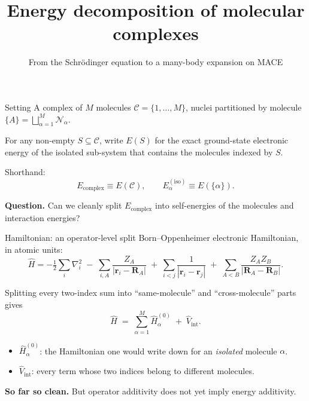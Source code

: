 \documentclass[aspectratio=169,11pt]{beamer}
\title{Energy decomposition of molecular complexes}
\subtitle{From the Schr\"odinger equation to a many-body expansion on \textsc{MACE}}
\author{}
\date{}
\newcommand{\Hop}{\hat{H}}
\newcommand{\Vop}{\hat{V}}
\newcommand{\Eiso}{E^{(\mathrm{iso})}}
\newcommand{\Ecpl}{E_{\mathrm{complex}}}
\begin{document}
\maketitle

\begin{frame}{Setting}
A complex of $M$ molecules
$\mathcal{C}=\{1,\dots,M\}$, nuclei partitioned by molecule
$\{A\}=\bigsqcup_{\alpha=1}^{M}\mathcal{N}_\alpha$.

\bigskip
For any non-empty $S\subseteq\mathcal{C}$, write $E(S)$ for the
exact ground-state electronic energy of the isolated sub-system that
contains the molecules indexed by $S$.

\bigskip
Shorthand:
\[
\Ecpl \equiv E(\mathcal{C}),
\qquad
\Eiso_\alpha \equiv E(\{\alpha\}).
\]

\bigskip
\textbf{Question.} \;Can we cleanly split
$\Ecpl$ into self-energies of the molecules and interaction energies?
\end{frame}

\begin{frame}{Hamiltonian: an operator-level split}
Born--Oppenheimer electronic Hamiltonian, in atomic units:
\[
\Hop = -\tfrac12\!\sum_{i}\nabla_i^2
\;-\;\sum_{i,A}\!\frac{Z_A}{|\mathbf r_i-\mathbf R_A|}
\;+\;\sum_{i<j}\!\frac{1}{|\mathbf r_i-\mathbf r_j|}
\;+\;\sum_{A<B}\!\frac{Z_A Z_B}{|\mathbf R_A-\mathbf R_B|}.
\]

Splitting every two-index sum into ``same-molecule'' and
``cross-molecule'' parts gives
\[
\boxed{\;\Hop \;=\; \sum_{\alpha=1}^{M}\Hop_\alpha^{(0)}
       \;+\;\Vop_{\mathrm{int}}.\;}
\]
\begin{itemize}\setlength\itemsep{2pt}
\item $\Hop_\alpha^{(0)}$: the Hamiltonian one would write down for an
\emph{isolated} molecule $\alpha$.
\item $\Vop_{\mathrm{int}}$: every term whose two indices belong to
different molecules.
\end{itemize}

\textbf{So far so clean.}\;
But operator additivity does not yet imply energy additivity.
\end{frame}
\end{document}
